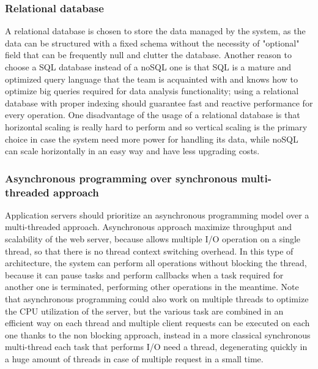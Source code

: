 \subsubsection{Relational database}
A relational database is chosen to store the data managed by the system, as the data can be structured with a fixed schema without the necessity of "optional" field that can be frequently null and clutter the database. Another reason to choose a SQL database instead of a noSQL one is that SQL is a mature and optimized query language that the team is acquainted with and knows how to optimize big queries required for data analysis functionality; using a relational database with proper indexing should guarantee fast and reactive performance for every operation. One disadvantage of the usage of a relational database is that horizontal scaling is really hard to perform and so vertical scaling is the primary choice in case the system need more power for handling its data, while noSQL can scale horizontally in an easy way and have less upgrading costs.

\subsubsection{Asynchronous programming over synchronous multi-threaded approach}
Application servers should prioritize an asynchronous programming model over a multi-threaded approach. Asynchronous approach maximize throughput and scalability of the web server, because allows multiple I/O operation on a single thread, so that there is no thread context switching overhead. In this type of architecture, the system can perform all operations without blocking the thread, because it can pause tasks and perform callbacks when a task required for another one is terminated, performing other operations in the meantime. Note that asynchronous programming could also work on multiple threads to optimize the CPU utilization of the server, but the various task are combined in an efficient way on each thread and multiple client requests can be executed on each one thanks to the non blocking approach, instead in a more classical synchronous multi-thread each task that performs I/O need a thread, degenerating quickly in a huge amount of threads in case of multiple request in a small time.